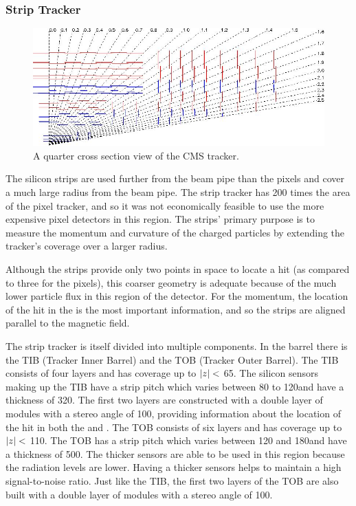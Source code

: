 \subsubsection{Strip Tracker}

\begin{figure}[!htbp]
    \centering
    \includegraphics[width=\textwidth]{figures/strip_layout.jpg}
    \caption{
        A quarter cross section view of the CMS tracker.
    }
    \label{fig:strip_layout}
\end{figure}

The silicon strips are used further from the beam pipe than the pixels and
cover a much large radius from the beam pipe. The strip tracker has 200 times
the area of the pixel tracker, and so it was not economically feasible to use
the more expensive pixel detectors in this region. The strips' primary purpose
is to measure the momentum and curvature of the charged particles by extending
the tracker's coverage over a larger radius.

Although the strips provide only two points in space to locate a hit (as
compared to three for the pixels), this coarser geometry is adequate because of
the much lower particle flux in this region of the detector. For the momentum,
the location of the hit in the \rphiplane is the most important information,
and so the strips are aligned parallel to the magnetic field.

The strip tracker is itself divided into multiple components. In the barrel
there is the TIB (Tracker Inner Barrel) and the TOB (Tracker Outer Barrel). The
TIB consists of four layers and has coverage up to $|z|<$ 65\centimeters.
The silicon sensors making up the TIB have a strip pitch which varies between
80 to 120\micrometers and have a thickness of 320\micrometers. The first two
layers are constructed with a double layer of modules with a stereo angle of
100\millirads, providing information about the location of the hit in both the
\coordrphi and \rzplane. The TOB consists of six layers and has coverage up to
$|z|<$ 110\centimeters. The TOB has a strip pitch which varies between
120 and 180\micrometers and have a thickness of 500\micrometers. The thicker
sensors are able to be used in this region because the radiation levels are
lower. Having a thicker sensors helps to maintain a high signal-to-noise ratio.
Just like the TIB, the first two layers of the TOB are also built with a double
layer of modules with a stereo angle of 100\millirads.

